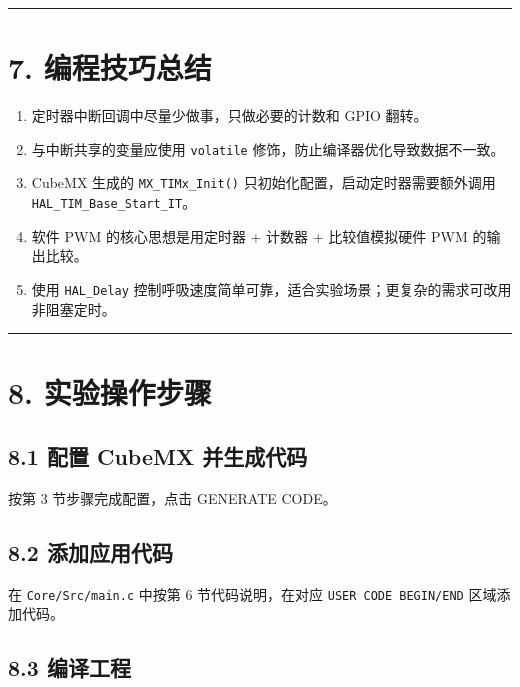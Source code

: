 \documentclass[
  chinese,
  UTF8,
  oneside,
  openany]{ctexbook}
\providecommand{\tightlist}{%
  \setlength{\itemsep}{0pt}\setlength{\parskip}{0pt}}
\begin{document}
\begin{center}\rule{0.5\linewidth}{0.5pt}\end{center}

\section{7. 编程技巧总结}\label{ux7f16ux7a0bux6280ux5de7ux603bux7ed3-3}

\begin{enumerate}
\def\labelenumi{\arabic{enumi}.}
\tightlist
\item
  定时器中断回调中尽量少做事，只做必要的计数和 GPIO 翻转。
\item
  与中断共享的变量应使用 \texttt{volatile}
  修饰，防止编译器优化导致数据不一致。
\item
  CubeMX 生成的 \texttt{MX\_TIMx\_Init()}
  只初始化配置，启动定时器需要额外调用
  \texttt{HAL\_TIM\_Base\_Start\_IT}。
\item
  软件 PWM 的核心思想是用定时器 + 计数器 + 比较值模拟硬件 PWM
  的输出比较。
\item
  使用 \texttt{HAL\_Delay}
  控制呼吸速度简单可靠，适合实验场景；更复杂的需求可改用非阻塞定时。
\end{enumerate}

\begin{center}\rule{0.5\linewidth}{0.5pt}\end{center}

\section{8. 实验操作步骤}\label{ux5b9eux9a8cux64cdux4f5cux6b65ux9aa4-3}

\subsection{8.1 配置 CubeMX
并生成代码}\label{ux914dux7f6e-cubemx-ux5e76ux751fux6210ux4ee3ux7801}

按第 3 节步骤完成配置，点击 GENERATE CODE。

\subsection{8.2
添加应用代码}\label{ux6dfbux52a0ux5e94ux7528ux4ee3ux7801}

在 \texttt{Core/Src/main.c} 中按第 6 节代码说明，在对应
\texttt{USER\ CODE\ BEGIN/END} 区域添加代码。

\subsection{8.3 编译工程}\label{ux7f16ux8bd1ux5de5ux7a0b-3}
\end{document}
